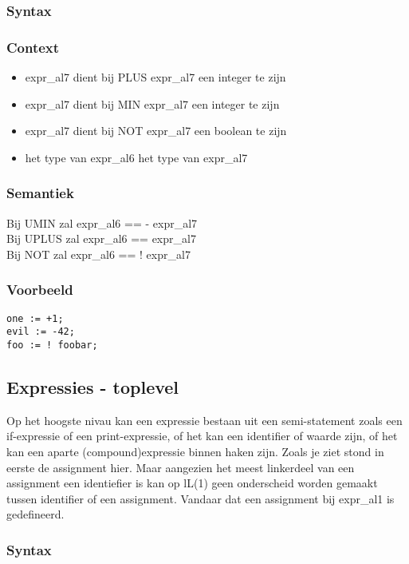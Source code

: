 \documentclass[]{article}
\begin{document}
\subsubsection{Syntax}

\subsubsection{Context}
\begin{itemize}
\item expr\_al7 dient bij PLUS expr\_al7 een integer te zijn
\item expr\_al7 dient bij MIN expr\_al7 een integer te zijn
\item expr\_al7 dient bij NOT expr\_al7 een boolean te zijn
\item het type van expr\_al6 het type van expr\_al7
\end{itemize}
\subsubsection{Semantiek}
Bij UMIN zal expr\_al6 == - expr\_al7 \\
Bij UPLUS zal expr\_al6 == expr\_al7 \\
Bij NOT zal expr\_al6 == ! expr\_al7 
\subsubsection{Voorbeeld}
\begin{lstlisting}[style=SELMA]
one := +1;
evil := -42;
foo := ! foobar;
\end{lstlisting}

\subsection{Expressies - toplevel}
Op het hoogste nivau kan een expressie bestaan uit een semi-statement zoals een if-expressie of een print-expressie, of het kan een identifier of waarde zijn, of het kan een aparte (compound)expressie binnen haken zijn.
Zoals je ziet stond in eerste de assignment hier. Maar aangezien het meest linkerdeel van een assignment een identiefier is kan op lL(1) geen onderscheid worden gemaakt tussen identifier of een assignment. Vandaar dat een assignment bij expr\_al1 is gedefineerd.
\subsubsection{Syntax}

\end{document}
